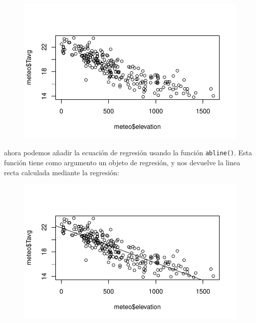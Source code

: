 \documentclass[
  letterpaper,
  DIV=11,
  numbers=noendperiod]{scrreprt}
\newenvironment{Shaded}{\begin{snugshade}}{\end{snugshade}}
\newcommand{\FunctionTok}[1]{\textcolor[rgb]{0.28,0.35,0.67}{#1}}
\newcommand{\NormalTok}[1]{\textcolor[rgb]{0.00,0.23,0.31}{#1}}
\newcommand{\SpecialCharTok}[1]{\textcolor[rgb]{0.37,0.37,0.37}{#1}}
\begin{document}
\begin{figure}[H]

{\centering \includegraphics{01_RegresionLineal_files/figure-pdf/unnamed-chunk-14-1.pdf}

}

\end{figure}

ahora podemos añadir la ecuación de regresión usando la función
\texttt{abline()}. Esta función tiene como argumento un objeto de
regresión, y nos devuelve la linea recta calculada mediante la
regresión:

\begin{Shaded}
\end{Shaded}

\begin{figure}[H]

{\centering \includegraphics{01_RegresionLineal_files/figure-pdf/unnamed-chunk-15-1.pdf}

}

\end{figure}
\end{document}
